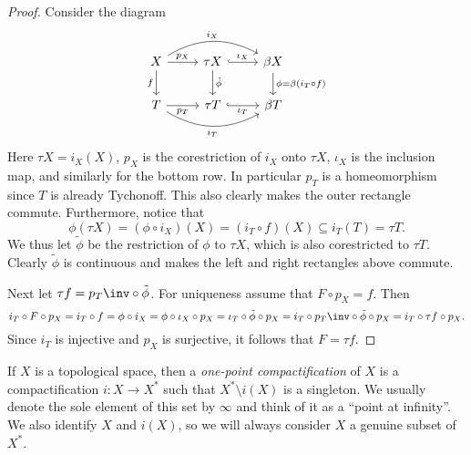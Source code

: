 \documentclass[article, a4paper, 11pt, oneside]{memoir}
\numberwithin{equation}{chapter}
\begin{document}
\begin{proof}
    Consider the diagram
    \begin{equation*}
        \begin{tikzcd}
            X
                \ar[d, "f", swap]
                \ar[r, "p_X"]
                \ar[rr, "i_X", bend left]
            & \tau X
                \ar[d, "\tilde{\phi}"]
                \ar[r, hookrightarrow, "\iota_X"]
            & \beta X
                \ar[d, "\phi = \beta(i_T \circ f)"]
            \\
            T
                \ar[r, "p_T", swap]
                \ar[rr, "i_T", swap, bend right]
            & \tau T
                \ar[r, hookrightarrow, "\iota_T", swap]
            & \beta T
        \end{tikzcd}
    \end{equation*}
    Here $\tau X = i_X(X)$, $p_X$ is the corestriction of $i_X$ onto $\tau X$, $\iota_X$ is the inclusion map, and similarly for the bottom row. In particular $p_T$ is a homeomorphism since $T$ is already Tychonoff. This also clearly makes the outer rectangle commute. Furthermore, notice that
    \begin{equation*}
        \phi(\tau X)
            = (\phi \circ i_X)(X)
            = (i_T \circ f)(X)
            \subseteq i_T(T)
            = \tau T.
    \end{equation*}
    We thus let $\tilde{\phi}$ be the restriction of $\phi$ to $\tau X$, which is also corestricted to $\tau T$. Clearly $\tilde{\phi}$ is continuous and makes the left and right rectangles above commute.

    Next let $\tau f = p_T\inv \circ \tilde{\phi}$. For uniqueness assume that $F \circ p_X = f$. Then
    \begin{equation*}
        i_T \circ F \circ p_X
            = i_T \circ f
            = \phi \circ i_X
            = \phi \circ \iota_X \circ p_X
            = \iota_T \circ \tilde{\phi} \circ p_X
            = i_T \circ p_T\inv \circ \tilde{\phi} \circ p_X
            = i_T \circ \tau f \circ p_X.
    \end{equation*}
    Since $i_T$ is injective and $p_X$ is surjective, it follows that $F = \tau f$.
\end{proof}


If $X$ is a topological space, then a \emph{one-point compactification} of $X$ is a compactification $i \colon X \to X^*$ such that $X^* \setminus i(X)$ is a singleton. We usually denote the sole element of this set by $\infty$ and think of it as a \enquote{point at infinity}. We also identify $X$ and $i(X)$, so we will always consider $X$ a genuine subset of $X^*$.
\end{document}
